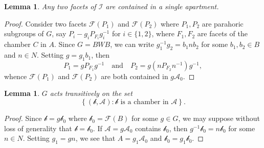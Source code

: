 \documentclass{article}
\theoremstyle{thmstyle}
\newtheorem{lemma}[theorem]{Lemma}
\theoremstyle{defstyle}
\newcommand{\scrA}{\mathscr{A}}
\newcommand{\scrb}{\mathscr{b}}
\newcommand{\scrF}{\mathscr{F}}
\newcommand{\scrI}{\mathscr{I}}
\begin{document}
\begin{lemma}
    Any two facets of $\scrI$ are contained in a single apartment.
\end{lemma}
\begin{proof}
    Consider two facets $\scrF(P_1)$ and $\scrF(P_2)$ where $P_1, P_2$ are parahoric subgroups of $G$, say $P_i - g_iP_{F_i}g_i^{-1}$ for $i\in\{1,2\}$, where $F_1, F_2$ are facets of the chamber $C$ in $A$. Since $G = BWB$, we can write $g_1^{-1}g_2 = b_1nb_2$ for some $b_1,b_2\in B$ and $n\in N$. Setting $g= g_1b_1$, then 
    \begin{equation*}
        P_1 = gP_{F_1}g^{-1}\quad\text{and}\quad P_2 = g\left(nP_{F_2}n^{-1}\right)g^{-1},
    \end{equation*}
    whence $\scrF(P_1)$ and $\scrF(P_2)$ are both contained in $g\scrA_0$.
\end{proof}

\begin{lemma}
    $G$ acts transitively on the set 
    \begin{equation*}
        \left\{(\scrb, \scrA)\colon\scrb\text{ is a chamber in }\scrA\right\}.
    \end{equation*}
\end{lemma}
\begin{proof}
    Since $\scrb = g\scrb_0$ where $\scrb_0 = \scrF(B)$ for some $g\in G$, we may suppose without loss of generality that $\scrb = \scrb_0$. If $\scrA = g\scrA_0$ contains $\scrb_0$, then $g^{-1}\scrb_0 = n\scrb_0$ for some $n\in N$. Setting $g_1 = gn$, we see that $A = g_1\scrA_0$ and $\scrb_0 = g_1\scrb_0$.
\end{proof}
\end{document}
